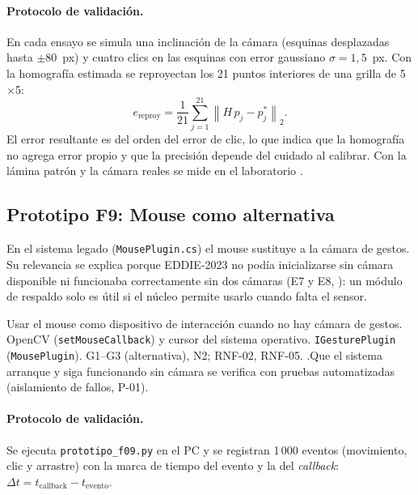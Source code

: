 \paragraph{Protocolo de validación.} En cada ensayo se simula una inclinación de la cámara (esquinas desplazadas hasta $\pm$80~px) y cuatro clics en las esquinas con error gaussiano $\sigma=1{,}5$~px. Con la homografía estimada se reproyectan los 21 puntos interiores de una grilla de 5$\times$5:
\begin{equation}
e_{\text{reproy}}=\frac{1}{21}\sum_{j=1}^{21}\left\lVert H\,p_j-p_j^{\ast}\right\rVert_2.
\end{equation}
El error resultante es del orden del error de clic, lo que indica que la homografía no agrega error propio y que la precisión depende del cuidado al calibrar. Con la lámina patrón y la cámara reales se mide en el laboratorio .

\subsection{Prototipo F9: Mouse como alternativa}

En el sistema legado (\texttt{MousePlugin.cs}) el mouse sustituye a la cámara de gestos. Su relevancia se explica porque EDDIE-2023 no podía inicializarse sin cámara disponible ni funcionaba correctamente sin dos cámaras (E7 y E8, \citealp{ibaceta2023}): un módulo de respaldo solo es útil si el núcleo permite usarlo cuando falta el sensor.

{Usar el mouse como dispositivo de interacción cuando no hay cámara de gestos.}
{OpenCV (\texttt{setMouseCallback}) y cursor del sistema operativo.}
{\texttt{IGesturePlugin} (\texttt{MousePlugin}).}
{G1--G3 (alternativa), N2; RNF-02, RNF-05.}
{ .\newline Que el sistema arranque y siga funcionando sin cámara se verifica con pruebas automatizadas (aislamiento de fallos, P-01).}

\paragraph{Protocolo de validación.} Se ejecuta \texttt{prototipo\_f09.py} en el PC y se registran 1\,000 eventos (movimiento, clic y arrastre) con la marca de tiempo del evento y la del \textit{callback}: $\Delta t=t_{\text{callback}}-t_{\text{evento}}$.

